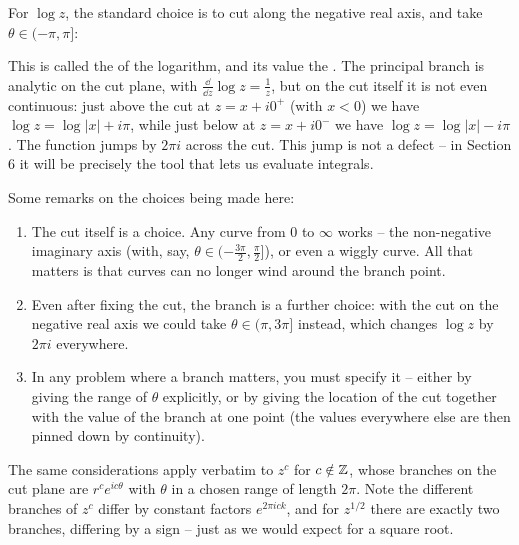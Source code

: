 \documentclass[a4paper]{scrartcl}
\begin{document}
For $\log z$, the standard choice is to cut along the negative real axis, and take $\theta \in (-\pi, \pi]$:

\begin{center}
\end{center}

This is called the  of the logarithm, and its value the . The principal branch is analytic on the cut plane, with $\frac{\dd}{\dd z}\log z = \frac{1}{z}$, but on the cut itself it is not even continuous: just above the cut at $z = x + i0^+$ (with $x < 0$) we have $\log z = \log|x| + i\pi$, while just below at $z = x + i0^-$ we have $\log z = \log |x| - i\pi$. The function jumps by $2\pi i$ across the cut. This jump is not a defect -- in Section 6 it will be precisely the tool that lets us evaluate integrals.

Some remarks on the choices being made here:
\begin{enumerate}[label=(\roman*)]
	\item The cut itself is a choice. Any curve from $0$ to $\infty$ works -- the non-negative imaginary axis (with, say, $\theta \in (-\frac{3\pi}{2}, \frac{\pi}{2}]$), or even a wiggly curve. All that matters is that curves can no longer wind around the branch point.
	\item Even after fixing the cut, the branch is a further choice: with the cut on the negative real axis we could take $\theta \in (\pi, 3\pi]$ instead, which changes $\log z$ by $2\pi i$ everywhere.
	\item In any problem where a branch matters, you must specify it -- either by giving the range of $\theta$ explicitly, or by giving the location of the cut together with the value of the branch at one point (the values everywhere else are then pinned down by continuity).
\end{enumerate}

The same considerations apply verbatim to $z^c$ for $c \notin \mathbb{Z}$, whose branches on the cut plane are $r^c e^{ic\theta}$ with $\theta$ in a chosen range of length $2\pi$. Note the different branches of $z^c$ differ by constant factors $e^{2\pi i c k}$, and for $z^{1/2}$ there are exactly two branches, differing by a sign -- just as we would expect for a square root.
\end{document}
